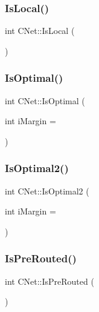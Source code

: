 \mbox{\label{classCNet_a2d8665848d2b21b355753866f872af45}} 
\subsubsection{\texorpdfstring{IsLocal()}{IsLocal()}}
{\footnotesize\ttfamily int C\+Net\+::\+Is\+Local (\begin{DoxyParamCaption}{ }\end{DoxyParamCaption})}

\mbox{\label{classCNet_af4f036ca5e1729d4d85130547b7d0e85}} 
\subsubsection{\texorpdfstring{IsOptimal()}{IsOptimal()}}
{\footnotesize\ttfamily int C\+Net\+::\+Is\+Optimal (\begin{DoxyParamCaption}\item[{int}]{i\+Margin = {} }\end{DoxyParamCaption})}

\mbox{\label{classCNet_adcd99220d0eb0a6c4f64577ff57a010e}} 
\subsubsection{\texorpdfstring{IsOptimal2()}{IsOptimal2()}}
{\footnotesize\ttfamily int C\+Net\+::\+Is\+Optimal2 (\begin{DoxyParamCaption}\item[{int}]{i\+Margin = {} }\end{DoxyParamCaption})}

\mbox{\label{classCNet_aafeb3181372a95390373d89b287c7e70}} 
\subsubsection{\texorpdfstring{IsPreRouted()}{IsPreRouted()}}
{\footnotesize\ttfamily int C\+Net\+::\+Is\+Pre\+Routed (\begin{DoxyParamCaption}{ }\end{DoxyParamCaption})}

